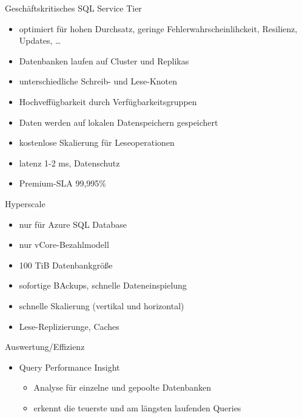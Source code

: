 \begin{flashcard}[Definition]{Geschäftskritisches SQL Service Tier}
  \begin{itemize}
    \item optimiert für hohen Durchsatz, geringe Fehlerwahrscheinlihckeit, Resilienz, Updates, \ldots
    \item Datenbanken laufen auf Cluster und Replikas
    \item unterschiedliche Schreib- und Lese-Knoten
    \item Hochveffügbarkeit durch Verfügbarkeitsgruppen
    \item Daten werden auf lokalen Datenspeichern gespeichert
    \item kostenlose Skalierung für Leseoperationen
    \item latenz 1-2 ms, Datenschutz
    \item Premium-SLA 99,995\%
  \end{itemize}
\end{flashcard}

\begin{flashcard}[Definition]{Hyperscale}
  \begin{itemize}
    \item nur für Azure SQL Database
    \item nur vCore-Bezahlmodell
    \item 100 TiB Datenbankgröße
    \item sofortige BAckups, schnelle Dateneinspielung
    \item schnelle Skalierung (vertikal und horizontal)
    \item Lese-Replizierunge, Caches
  \end{itemize}
\end{flashcard}

\begin{flashcard}[Definition]{Auswertung/Effizienz}
  \begin{itemize}
    \item Query Performance Insight
    \begin{itemize}
      \item Analyse für einzelne und gepoolte Datenbanken
      \item erkennt die teuerste und am längsten laufenden Queries
    \end{itemize}
  \end{itemize}
\end{flashcard}

